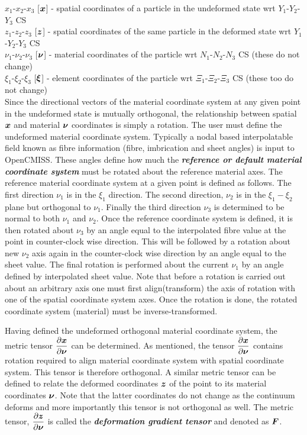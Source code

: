 \noindent $x_{1}$-$x_{2}$-$x_{3}$ [$\vect{x}$] - spatial coordinates of a particle in the undeformed state wrt $Y_{1}$-$Y_{2}$-$Y_{3}$ CS \\
$z_{1}$-$z_{2}$-$z_{3}$ [$\vect{z}$] - spatial coordinates of the same particle in the deformed state wrt $Y_{1}$-$Y_{2}$-$Y_{3}$ CS \\ 
$\nu_{1}$-$\nu_{2}$-$\nu_{3}$ [$\vect{\nu}$] - material coordinates of the particle wrt $N_{1}$-$N_{2}$-$N_{3}$ CS (these do not change) \\
$\xi_{1}$-$\xi_{2}$-$\xi_{3}$ [$\vect{\xi}$] - element coordinates of the particle wrt $\Xi_{1}$-$\Xi_{2}$-$\Xi_{3}$ CS (these too do not change)\\

Since the directional vectors of the material coordinate system at any given point in the undeformed state is mutually orthogonal, the 
relationship between spatial $\vect{x}$ and material $\vect{\nu}$ coordinates is simply a rotation. The user must define the undeformed 
material coordinate system. Typically a nodal based interpolatable field known as fibre information (fibre, imbrication and sheet angles) 
is input to OpenCMISS. These angles define how much the \textit{\textbf{reference or default material coordinate system}} must be rotated about 
the reference material axes. The reference material coordinate system at a given point is defined as follows. The first direction $\nu_{1}$ is 
in the $\xi_{1}$ direction. The second direction, $\nu_{2}$ is in the $\xi_{1}-\xi_{2}$ plane but orthogonal to $\nu_{1}$. Finally the third 
direction $\nu_{3}$ is determined to be normal to both $\nu_{1}$ and $\nu_{2}$. Once the reference coordinate system is defined, it is then rotated 
about $\nu_{3}$ by an angle equal to the interpolated fibre value at the point in counter-clock wise direction. This will be followed by a rotation 
about new $\nu_{2}$ axis again in the counter-clock wise direction by an angle equal to the sheet value. The final rotation is performed about the 
current $\nu_{1}$ by an angle defined by interpolated sheet value. Note that before a rotation is carried out about an arbitrary axis one must first 
align(transform) the axis of rotation with one of the spatial coordinate system axes. Once the rotation is done, the rotated coordinate 
system (material) must be inverse-transformed. 

Having defined the undeformed orthogonal material coordinate system, the metric tensor $\delby{\vect{x}}{\vect{\nu}}$ can be determined. As mentioned,
the tensor $\delby{\vect{x}}{\vect{\nu}}$ contains rotation required to align material coordinate system with spatial coordinate system. This tensor
is therefore orthogonal. A similar metric tensor can be defined to relate the deformed coordinates $\vect{z}$ of the point to its material
coordinates $\vect{\nu}$. Note that the latter coordinates do not change as the continuum deforms and more importantly this tensor is not 
orthogonal as well. The metric tensor, $\delby{\vect{z}}{\vect{\nu}}$ is called the \textit{\textbf{deformation gradient tensor}} and denoted 
as $\matr{F}$.

